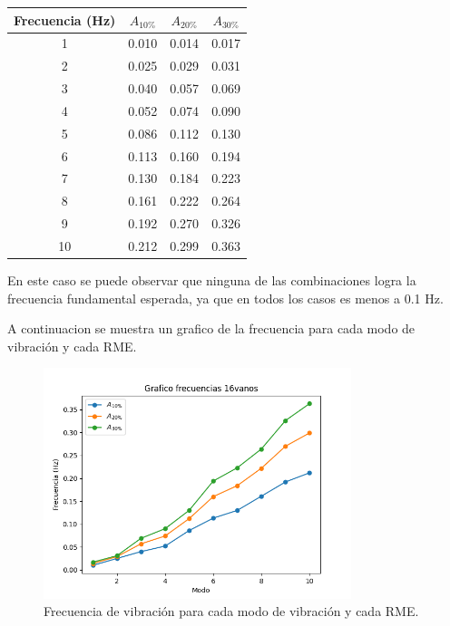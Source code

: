 \begin{table}[H]
    \centering
    \begin{tabular}{cccc}
    \toprule
     Frecuencia (Hz) & $A_{10\%}$ & $A_{20\%}$ & $A_{30\%}$ \\
    \midrule
     1 &       0.010 &       0.014 &       0.017 \\
     2 &       0.025 &       0.029 &       0.031 \\
     3 &       0.040 &       0.057 &       0.069 \\
     4 &       0.052 &       0.074 &       0.090 \\
     5 &       0.086 &       0.112 &       0.130 \\
     6 &       0.113 &       0.160 &       0.194 \\
     7 &       0.130 &       0.184 &       0.223 \\
     8 &       0.161 &       0.222 &       0.264 \\
     9 &       0.192 &       0.270 &       0.326 \\
     10 &       0.212 &       0.299 &       0.363 \\
    \bottomrule
    \end{tabular}
\end{table}

En este caso se puede observar que ninguna de las combinaciones logra la frecuencia fundamental esperada, ya que en todos los casos es menos a 0.1 Hz.

A continuacion se muestra un grafico de la frecuencia para cada modo de vibración y cada RME. 

\begin{figure}[H]
    \centering
    \includegraphics[width=0.8\textwidth]{../grafico_frecuencias_16vanos.png}
    \caption{Frecuencia de vibración para cada modo de vibración y cada RME.}
\end{figure}


